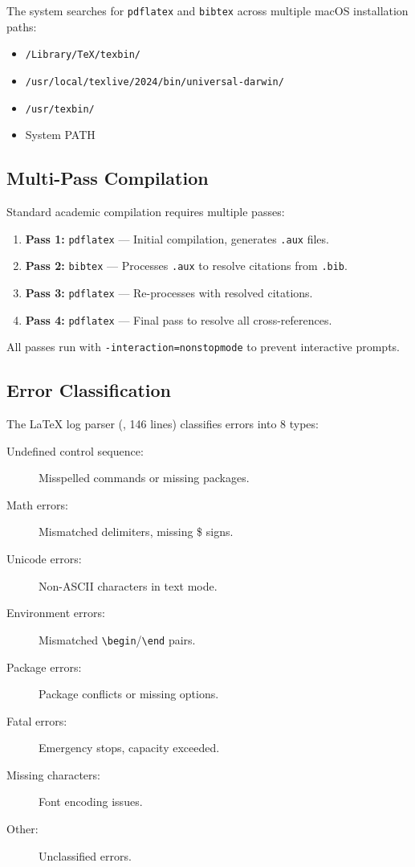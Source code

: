 The system searches for \texttt{pdflatex} and \texttt{bibtex} across multiple macOS installation paths:

\begin{itemize}
  \item \texttt{/Library/TeX/texbin/}
  \item \texttt{/usr/local/texlive/2024/bin/universal-darwin/}
  \item \texttt{/usr/texbin/}
  \item System PATH
\end{itemize}

\subsection{Multi-Pass Compilation}

Standard academic compilation requires multiple passes:

\begin{enumerate}
  \item \textbf{Pass 1:} \texttt{pdflatex} --- Initial compilation, generates \texttt{.aux} files.
  \item \textbf{Pass 2:} \texttt{bibtex} --- Processes \texttt{.aux} to resolve citations from \texttt{.bib}.
  \item \textbf{Pass 3:} \texttt{pdflatex} --- Re-processes with resolved citations.
  \item \textbf{Pass 4:} \texttt{pdflatex} --- Final pass to resolve all cross-references.
\end{enumerate}

All passes run with \texttt{-interaction=nonstopmode} to prevent interactive prompts.

\subsection{Error Classification}

The \LaTeX{} log parser (, 146 lines) classifies errors into 8 types:

\begin{description}
  \item[Undefined control sequence:] Misspelled commands or missing packages.
  \item[Math errors:] Mismatched delimiters, missing \$ signs.
  \item[Unicode errors:] Non-ASCII characters in text mode.
  \item[Environment errors:] Mismatched \texttt{\textbackslash begin}/\texttt{\textbackslash end} pairs.
  \item[Package errors:] Package conflicts or missing options.
  \item[Fatal errors:] Emergency stops, capacity exceeded.
  \item[Missing characters:] Font encoding issues.
  \item[Other:] Unclassified errors.
\end{description}


